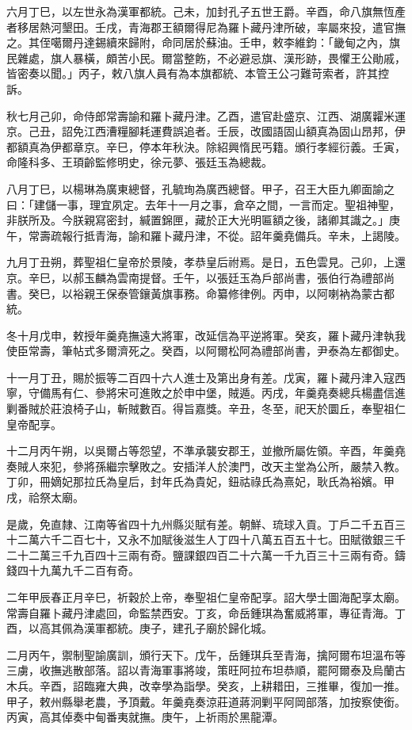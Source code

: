 \begin{pinyinscope}
六月丁巳，以左世永為漢軍都統。己未，加封孔子五世王爵。辛酉，命八旗無恆產者移居熱河墾田。壬戌，青海郡王額爾得尼為羅卜藏丹津所破，率屬來投，遣官撫之。其侄噶爾丹達錫續來歸附，命同居於蘇油。壬申，敕李維鈞：「畿甸之內，旗民雜處，旗人暴橫，頗苦小民。爾當整飭，不必避忌旗、漢形跡，畏懼王公勛戚，皆密奏以聞。」丙子，敕八旗人員有為本旗都統、本管王公刁難苛索者，許其控訴。

秋七月己卯，命侍郎常壽諭和羅卜藏丹津。乙酉，遣官赴盛京、江西、湖廣糶米運京。己丑，詔免江西漕糧腳耗運費誤追者。壬辰，改國語固山額真為固山昂邦，伊都額真為伊都章京。辛巳，停本年秋決。除紹興惰民丐籍。頒行孝經衍義。壬寅，命隆科多、王頊齡監修明史，徐元夢、張廷玉為總裁。

八月丁巳，以楊琳為廣東總督，孔毓珣為廣西總督。甲子，召王大臣九卿面諭之曰：「建儲一事，理宜夙定。去年十一月之事，倉卒之間，一言而定。聖祖神聖，非朕所及。今朕親寫密封，緘置錦匣，藏於正大光明匾額之後，諸卿其識之。」庚午，常壽疏報行抵青海，諭和羅卜藏丹津，不從。詔年羹堯備兵。辛未，上謁陵。

九月丁丑朔，葬聖祖仁皇帝於景陵，孝恭皇后祔焉。是日，五色雲見。己卯，上還京。辛巳，以郝玉麟為雲南提督。壬午，以張廷玉為戶部尚書，張伯行為禮部尚書。癸巳，以裕親王保泰管鑲黃旗事務。命纂修律例。丙申，以阿喇衲為蒙古都統。

冬十月戊申，敕授年羹堯撫遠大將軍，改延信為平逆將軍。癸亥，羅卜藏丹津執我使臣常壽，筆帖式多爾濟死之。癸酉，以阿爾松阿為禮部尚書，尹泰為左都御史。

十一月丁丑，賜於振等二百四十六人進士及第出身有差。戊寅，羅卜藏丹津入寇西寧，守備馬有仁、參將宋可進敗之於申中堡，賊遁。丙戌，年羹堯奏總兵楊盡信進剿番賊於莊浪椅子山，斬賊數百。得旨嘉獎。辛丑，冬至，祀天於圜丘，奉聖祖仁皇帝配享。

十二月丙午朔，以吳爾占等怨望，不準承襲安郡王，並撤所屬佐領。辛酉，年羹堯奏賊人來犯，參將孫繼宗擊敗之。安插洋人於澳門，改天主堂為公所，嚴禁入教。丁卯，冊嫡妃那拉氏為皇后，封年氏為貴妃，鈕祜祿氏為熹妃，耿氏為裕嬪。甲戌，祫祭太廟。

是歲，免直隸、江南等省四十九州縣災賦有差。朝鮮、琉球入貢。丁戶二千五百三十二萬六千二百七十，又永不加賦後滋生人丁四十八萬五百五十七。田賦徵銀三千二十二萬三千九百四十三兩有奇。鹽課銀四百二十六萬一千九百三十三兩有奇。鑄錢四十九萬九千二百有奇。

二年甲辰春正月辛巳，祈穀於上帝，奉聖祖仁皇帝配享。詔大學士圖海配享太廟。常壽自羅卜藏丹津處回，命監禁西安。丁亥，命岳鍾琪為奮威將軍，專征青海。丁酉，以高其佩為漢軍都統。庚子，建孔子廟於歸化城。

二月丙午，禦制聖諭廣訓，頒行天下。戊午，岳鍾琪兵至青海，擒阿爾布坦溫布等三虜，收撫逃散部落。詔以青海軍事將竣，策旺阿拉布坦恭順，罷阿爾泰及烏蘭古木兵。辛酉，詔臨雍大典，改幸學為詣學。癸亥，上耕耤田，三推畢，復加一推。甲子，敕州縣舉老農，予頂戴。年羹堯奏涼莊道蔣泂剿平阿岡部落，加按察使銜。丙寅，高其倬奏中甸番夷就撫。庚午，上祈雨於黑龍潭。


\end{pinyinscope}
